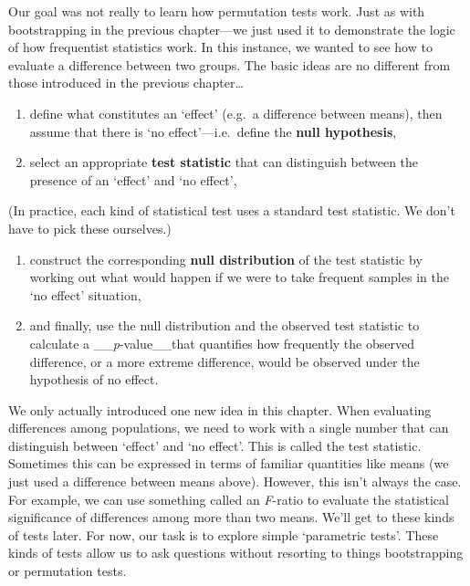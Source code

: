\documentclass[
]{book}
\begin{document}
Our goal was not really to learn how permutation tests work. Just as with bootstrapping in the previous chapter---we just used it to demonstrate the logic of how frequentist statistics work. In this instance, we wanted to see how to evaluate a difference between two groups. The basic ideas are no different from those introduced in the previous chapter\ldots{}

\begin{enumerate}
\def\labelenumi{\arabic{enumi}.}
\item
  define what constitutes an `effect' (e.g.~a difference between means), then assume that there is `no effect'---i.e.~define the \textbf{null hypothesis},
\item
  select an appropriate \textbf{test statistic} that can distinguish between the presence of an `effect' and `no effect',
\end{enumerate}

(In practice, each kind of statistical test uses a standard test statistic. We don't have to pick these ourselves.)

\begin{enumerate}
\def\labelenumi{\arabic{enumi}.}
\setcounter{enumi}{2}
\item
  construct the corresponding \textbf{null distribution} of the test statistic by working out what would happen if we were to take frequent samples in the `no effect' situation,
\item
  and finally, use the null distribution and the observed test statistic to calculate a \_\_\emph{p}-value\_\_that quantifies how frequently the observed difference, or a more extreme difference, would be observed under the hypothesis of no effect.
\end{enumerate}

We only actually introduced one new idea in this chapter. When evaluating differences among populations, we need to work with a single number that can distinguish between `effect' and `no effect'. This is called the test statistic. Sometimes this can be expressed in terms of familiar quantities like means (we just used a difference between means above). However, this isn't always the case. For example, we can use something called an \emph{F}-ratio to evaluate the statistical significance of differences among more than two means. We'll get to these kinds of tests later. For now, our task is to explore simple `parametric tests'. These kinds of tests allow us to ask questions without resorting to things bootstrapping or permutation tests.
\end{document}
